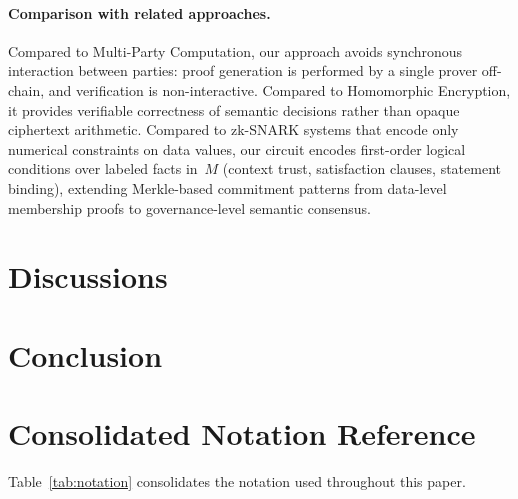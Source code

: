 \documentclass[journal]{IEEEtran}
\begin{document}
\paragraph{Comparison with related approaches.}
Compared to Multi-Party Computation, our approach avoids synchronous
interaction between parties: proof generation is performed by a
single prover off-chain, and verification is non-interactive.
Compared to Homomorphic Encryption, it provides verifiable
correctness of semantic decisions rather than opaque ciphertext
arithmetic. Compared to zk-SNARK systems that encode only numerical
constraints on data values, our circuit encodes first-order logical
conditions over labeled facts in~$M$ (context trust, satisfaction
clauses, statement binding), extending Merkle-based commitment
patterns from data-level membership proofs to governance-level
semantic consensus.

\section{Discussions}
\label{s:discussions}

\section{Conclusion}
\label{s:conclusion}


\appendices
\section{Consolidated Notation Reference}
\label{app:notation}

Table~\ref{tab:notation} consolidates the notation used throughout this paper.
\end{document}
